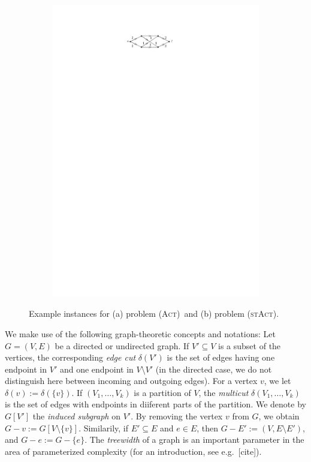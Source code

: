 \documentclass[10pt,a4paper]{article}
\numberwithin{equation}{section}
\newcommand{\set}[1]{\{ #1 \}}
\newcommand{\act}{\textsc{(Act)}}
\newcommand{\stact}{\textsc{(stAct)}}
\begin{document}
\begin{figure}
\begin{subfigure}[t]{0.3\textwidth}
         \label{fig:example_act}
     \end{subfigure}
     \begin{subfigure}[t]{0.3\textwidth}
         \centering
         \includegraphics[scale=1]{img/example-st-act}
         \label{fig:example_st_act}
     \end{subfigure}
        \caption{Example instances for (a) problem \act\ and (b) problem \stact.}
        \label{fig:introduction_examples}
\end{figure}

We make use of the following graph-theoretic concepts and notations: Let $G = (V,E)$ be a directed or undirected graph. If $V' \subseteq V$ is a subset of the vertices, the corresponding \emph{edge cut} $\delta(V')$ is the set of edges having one endpoint in $V'$ and one endpoint in $V \setminus V'$ (in the directed case, we do not distinguish here between incoming and outgoing edges). For a vertex $v$, we let $\delta(v) := \delta(\set{v})$. If $(V_1,\dots,V_k)$ is a partition of $V$, the \emph{multicut} $\delta(V_1,\dots,V_k)$ is the set of edges with endpoints in diiferent parts of the partition. We denote by $G[V']$ the \emph{induced subgraph} on $V'$. By removing the vertex $v$ from $G$, we obtain $G - v := G[V \setminus \set{v}]$. Similarily, if $E' \subseteq E$ and $e \in E$, then $G - E' := (V, E \setminus E')$, and $G - e := G - \set{e}$. The \emph{treewidth} of a graph is an important parameter in the area of parameterized complexity (for an introduction, see e.g.\ [cite]).
\end{document}

